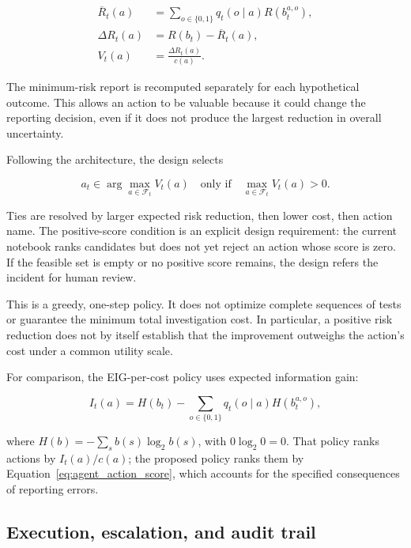\documentclass{article}
\begin{document}
\begin{align}
\overline{R}_t(a)
&=\sum_{o\in\{0,1\}}q_t(o\mid a)R(b_t^{a,o}),
\label{eq:agent_expected_posterior_risk}\\
\Delta R_t(a)&=R(b_t)-\overline{R}_t(a),
\label{eq:agent_risk_reduction}\\
V_t(a)&=\frac{\Delta R_t(a)}{c(a)}.
\label{eq:agent_action_score}
\end{align}

The minimum-risk report is recomputed separately for each hypothetical
outcome. This allows an action to be valuable because it could change the
reporting decision, even if it does not produce the largest reduction in
overall uncertainty.

Following the architecture, the design selects

\begin{equation}
a_t\in\arg\max_{a\in\mathcal{F}_t}V_t(a)
\quad\text{only if}\quad
\max_{a\in\mathcal{F}_t}V_t(a)>0.
\label{eq:agent_selected_action}
\end{equation}

Ties are resolved by larger expected risk reduction, then lower cost, then
action name. The positive-score condition is an explicit design
requirement: the current notebook ranks candidates but does not yet reject
an action whose score is zero. If the feasible set is empty or no positive
score remains, the design refers the incident for human review.

This is a greedy, one-step policy. It does not optimize complete sequences
of tests or guarantee the minimum total investigation cost. In particular,
a positive risk reduction does not by itself establish that the improvement
outweighs the action's cost under a common utility scale.

For comparison, the EIG-per-cost policy uses expected information gain:

\begin{equation}
I_t(a)=H(b_t)-\sum_{o\in\{0,1\}}q_t(o\mid a)H(b_t^{a,o}),
\label{eq:agent_eig_baseline}
\end{equation}

where $H(b)=-\sum_s b(s)\log_2 b(s)$, with $0\log_2 0=0$. That policy
ranks actions by $I_t(a)/c(a)$; the proposed policy ranks them by
Equation~\eqref{eq:agent_action_score}, which accounts for the specified
consequences of reporting errors.

\subsection{Execution, escalation, and audit trail}
\end{document}
